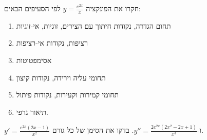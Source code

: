 
\begin{question}
חקרו את הפונקציה $y=\frac{e^{2x}}{x}$ לפי הסעיפים הבאים:
\begin{enumerate}
  \item תחום הגדרה, נקודות חיתוך עם הצירים, זוגיות, אי-זוגיות
  \item רציפות, נקודות אי-רציפות
  \item אסימפטוטות
  \item תחומי עליה וירידה, נקודות קיצון
  \item תחומי קמירות וקעירות, נקודות פיתול
  \item תיאור גרפי.
\end{enumerate}
\end{question}

\begin{hint}
$y'=\frac{e^{2x}(2x-1)}{x^2}$ ו-$y''=\frac{2e^{2x}(2x^2-2x+1)}{x^3}$. בדקו את הסימן של כל גורם.
\end{hint}

